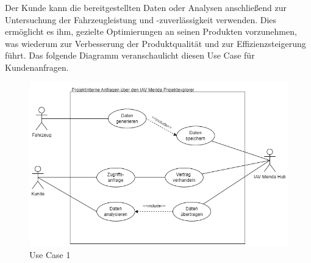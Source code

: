 Der Kunde kann die bereitgestellten Daten oder Analysen anschließend zur Untersuchung der Fahrzeugleistung und -zuverlässigkeit verwenden. Dies ermöglicht es ihm, gezielte Optimierungen an seinen Produkten vorzunehmen, was wiederum zur Verbesserung der Produktqualität und zur Effizienzsteigerung führt.
\newline
Das folgende Diagramm veranschaulicht diesen Use Case für Kundenanfragen.
\begin{figure}[H]
    \centering
    \includegraphics[scale=.6]{media/UseCase1}
    \caption{Use Case 1}
    \label{fig:UseCase1}
\end{figure}
\newpage
